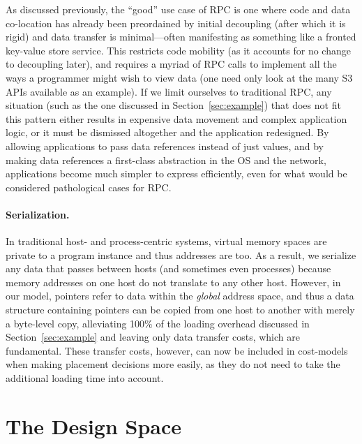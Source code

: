 {    As discussed previously, the ``good'' use case of RPC is one where code and data
    co-location has already been preordained by initial decoupling (after which it is rigid) and
    data transfer is minimal---often manifesting as something like a fronted key-value store service. This restricts
    code mobility (as it accounts for no change to decoupling later), and requires a myriad of RPC calls
    to implement all the ways a programmer might wish to view data (one need only look at the many S3
    APIs available as an example).
    If we limit ourselves to traditional RPC, any situation (such as the one discussed in
    Section~\ref{sec:example}) that does not fit this pattern either results in expensive data movement
    and complex application logic, or it must be dismissed altogether and the application redesigned.
    By allowing applications to pass data references instead of just values, and by making data
    references a first-class abstraction in the OS and the network, applications become much simpler to
    express efficiently, even for what would be considered pathological cases for RPC.

    \paragraph*{Serialization.}
    In traditional host- and process-centric systems, virtual memory spaces are private to a
    program instance and thus addresses are too. As a result, we serialize any data that passes between
    hosts (and sometimes even processes) because memory addresses on one host do not translate to any
    other host. However, in our model, pointers refer to data within the \emph{global} address space,
    and thus a data structure containing pointers can be copied from one host to another with merely a
    byte-level copy, alleviating 100\% of the loading overhead discussed in Section~\ref{sec:example}
    and leaving only data transfer costs, which are fundamental. These transfer costs, however, can now
    be included in cost-models when making placement decisions more easily, as they do not need to take
    the additional loading time into account.

}


\section{The Design Space}



